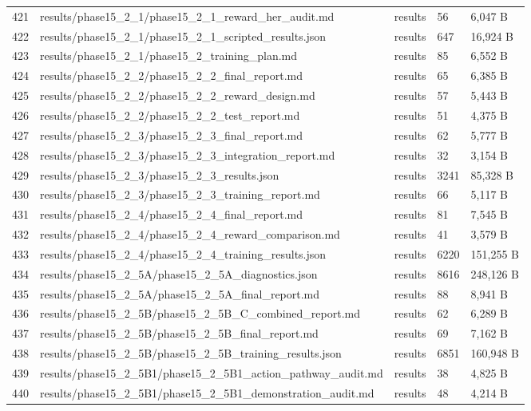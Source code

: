 \documentclass[11pt,a4paper,oneside]{book}
\begin{document}
\begin{longtable}{l l l l l}
421 & results/phase15\_2\_1/phase15\_2\_1\_reward\_her\_audit.md & results & 56 & 6,047 B \\
422 & results/phase15\_2\_1/phase15\_2\_1\_scripted\_results.json & results & 647 & 16,924 B \\
423 & results/phase15\_2\_1/phase15\_2\_training\_plan.md & results & 85 & 6,552 B \\
424 & results/phase15\_2\_2/phase15\_2\_2\_final\_report.md & results & 65 & 6,385 B \\
425 & results/phase15\_2\_2/phase15\_2\_2\_reward\_design.md & results & 57 & 5,443 B \\
426 & results/phase15\_2\_2/phase15\_2\_2\_test\_report.md & results & 51 & 4,375 B \\
427 & results/phase15\_2\_3/phase15\_2\_3\_final\_report.md & results & 62 & 5,777 B \\
428 & results/phase15\_2\_3/phase15\_2\_3\_integration\_report.md & results & 32 & 3,154 B \\
429 & results/phase15\_2\_3/phase15\_2\_3\_results.json & results & 3241 & 85,328 B \\
430 & results/phase15\_2\_3/phase15\_2\_3\_training\_report.md & results & 66 & 5,117 B \\
431 & results/phase15\_2\_4/phase15\_2\_4\_final\_report.md & results & 81 & 7,545 B \\
432 & results/phase15\_2\_4/phase15\_2\_4\_reward\_comparison.md & results & 41 & 3,579 B \\
433 & results/phase15\_2\_4/phase15\_2\_4\_training\_results.json & results & 6220 & 151,255 B \\
434 & results/phase15\_2\_5A/phase15\_2\_5A\_diagnostics.json & results & 8616 & 248,126 B \\
435 & results/phase15\_2\_5A/phase15\_2\_5A\_final\_report.md & results & 88 & 8,941 B \\
436 & results/phase15\_2\_5B/phase15\_2\_5B\_C\_combined\_report.md & results & 62 & 6,289 B \\
437 & results/phase15\_2\_5B/phase15\_2\_5B\_final\_report.md & results & 69 & 7,162 B \\
438 & results/phase15\_2\_5B/phase15\_2\_5B\_training\_results.json & results & 6851 & 160,948 B \\
439 & results/phase15\_2\_5B1/phase15\_2\_5B1\_action\_pathway\_audit.md & results & 38 & 4,825 B \\
440 & results/phase15\_2\_5B1/phase15\_2\_5B1\_demonstration\_audit.md & results & 48 & 4,214 B \\

\end{longtable}
\end{document}
